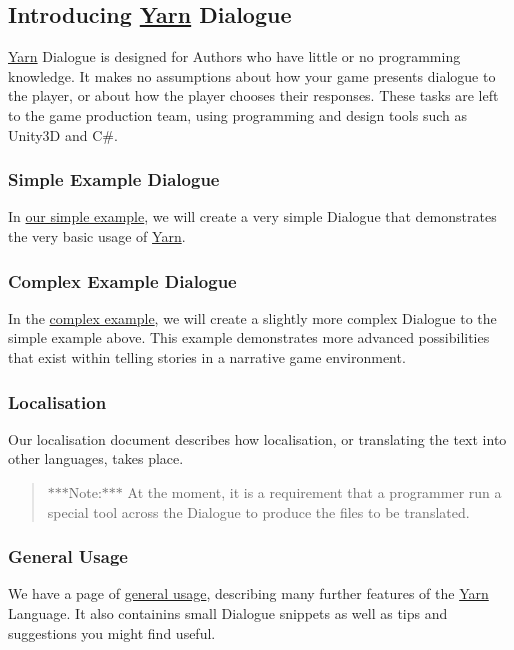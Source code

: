 \subsection*{Introducing \hyperlink{a00040}{Yarn} Dialogue}

\hyperlink{a00040}{Yarn} Dialogue is designed for Authors who have little or no programming knowledge. It makes no assumptions about how your game presents dialogue to the player, or about how the player chooses their responses. These tasks are left to the game production team, using programming and design tools such as Unity3\-D and C\#.

\subsubsection*{Simple Example Dialogue}

In \hyperlink{a00118}{our simple example}, we will create a very simple Dialogue that demonstrates the very basic usage of \hyperlink{a00040}{Yarn}.

\subsubsection*{Complex Example Dialogue}

In the \hyperlink{a00117}{complex example}, we will create a slightly more complex Dialogue to the simple example above. This example demonstrates more advanced possibilities that exist within telling stories in a narrative game environment.

\subsubsection*{Localisation}

Our localisation document describes how localisation, or translating the text into other languages, takes place. \begin{quotation}
$\ast$$\ast$$\ast$\-Note\-:$\ast$$\ast$$\ast$ At the moment, it is a requirement that a programmer run a special tool across the Dialogue to produce the files to be translated.

\end{quotation}


\subsubsection*{General Usage}

We have a page of \hyperlink{a00116}{general usage}, describing many further features of the \hyperlink{a00040}{Yarn} Language. It also containins small Dialogue snippets as well as tips and suggestions you might find useful. 